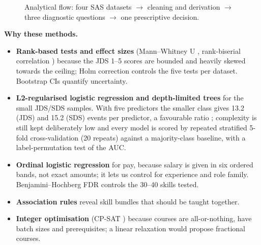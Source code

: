 \begin{figure}[H]
\caption{Analytical flow: four SAS datasets $\rightarrow$ cleaning and derivation $\rightarrow$
three diagnostic questions $\rightarrow$ one prescriptive decision.}\label{fig:flow}
\end{figure}

\textbf{Why these methods.}
\begin{itemize}
  \item \textbf{Rank-based tests and effect sizes} (Mann--Whitney U \citep{mannwhitney1947},
        rank-biserial correlation \citep{kerby2014}) because the JDS 1--5 scores are bounded and
        heavily skewed towards the ceiling; Holm correction \citep{holm1979} controls the five
        tests per dataset. Bootstrap CIs \citep{efron1993} quantify uncertainty.
  \item \textbf{L2-regularised logistic regression and depth-limited trees} \citep{breiman1984}
        for the small JDS/SDS samples. With five predictors the smaller class gives 13.2 (JDS) and
        15.2 (SDS) events per predictor, a favourable ratio \citep{peduzzi1996,vittinghoff2007};
        complexity is still kept deliberately low and every model is scored by repeated stratified
        5-fold cross-validation (20 repeats) against a majority-class baseline, with a label-permutation
        test of the AUC.
  \item \textbf{Ordinal logistic regression} \citep{mccullagh1980} for pay, because salary is
        given in six ordered bands, not exact amounts; it lets us control for experience and role
        family. Benjamini--Hochberg FDR \citep{benjamini1995} controls the 30--40 skills tested.
  \item \textbf{Association rules} \citep{agrawal1994} reveal skill bundles that should be taught
        together.
  \item \textbf{Integer optimisation} (CP-SAT \citep{cpsat}) because courses are all-or-nothing,
        have batch sizes and prerequisites; a linear relaxation would propose fractional courses.
\end{itemize}

